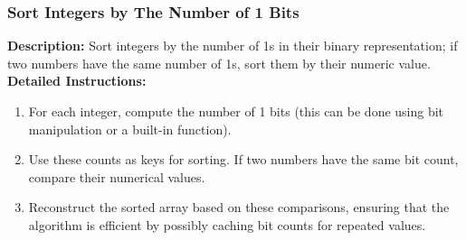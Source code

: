 \subsubsection{Sort Integers by The Number of 1 Bits}
\textbf{Description:} Sort integers by the number of 1s in their binary representation; if two numbers have the same number of 1s, sort them by their numeric value. \\
\textbf{Detailed Instructions:}
\begin{enumerate}
    \item For each integer, compute the number of 1 bits (this can be done using bit manipulation or a built-in function).
    \item Use these counts as keys for sorting. If two numbers have the same bit count, compare their numerical values.
    \item Reconstruct the sorted array based on these comparisons, ensuring that the algorithm is efficient by possibly caching bit counts for repeated values.
\end{enumerate}